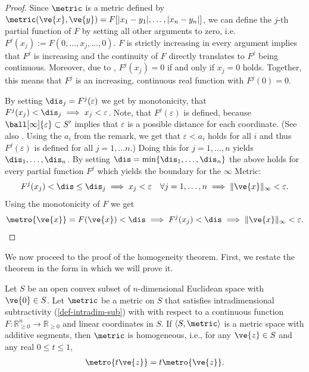 \begin{proof}
  Since $\metric$ is a metric defined by $\metric(\ve{x},\ve{y}) = F[|x_1 - y_1|, \dots, |x_n - y_n|]$, we can define the $j$-th partial function of $F$ by setting all other arguments to zero, i.e. $F^j(x_j) := F(0, \dots, x_j, \dots, 0)$.
  $F$ is strictly increasing in every argument implies that $F^j$ is increasing and the continuity of $F$ directly translates to $F^j$ being continuous.
  Moreover, due to , $F^j(x_j) = 0$ if and only if $x_j = 0$ holds.
  Together, this means that $F^j$ is an increasing, continuous real function with $F^j(0) = 0$.

	By setting $\dis_j = F^j(\varepsilon)$ we get by monotonicity, that $F^j(x_j) < \dis_j \implies x_j < \varepsilon$. Note, that $F^j(\varepsilon)$ is defined, because  $\ball[\infty]{\varepsilon} \subset S'$ implies that $\varepsilon$ is a possible distance for each coordinate. (See also . Using the $a_i$ from the remark, we get that $\varepsilon < a_i$ holds for all $i$ and thus $F^j(\varepsilon)$ is defined for all $j = 1, \dots n$.)
	Doing this for $j = 1, \dots, n$ yields $\dis_1, \dots, \dis_n$.
	By setting $\dis = \min \{\dis_1, \dots, \dis_n\}$ the above holds for every partial function $F^j$ which yields the boundary for the $\infty$ Metric:
	$$ F^j(x_j) < \dis \leq \dis_j \implies x_j < \varepsilon \quad \forall j = 1, \dots, n \implies \|\ve{x}\|_{\infty} < \varepsilon.$$
	Using the monotonicity of $F$ we get
	$$\metro{\ve{x}} = F(\ve{x}) < \dis \implies F^j(x_j) < \dis \implies \|\ve{x}\|_\infty < \varepsilon.$$
\end{proof}

We now proceed to the proof of the homogeneity theorem. First, we restate the theorem in the form in which we will prove it.

\begin{lem*}
  Let $S$ be an open convex subset of $n$-dimensional Euclidean space with $\ve{0} \in S$. Let $\metric$ be a metric on $S$ that satisfies intradimensional subtractivity (\cref{def-intradim-sub}) with with respect to a continuous function $F: \mathbb{R}_{\geq 0}^n \rightarrow \mathbb{R}_{\geq 0}$ and linear coordinates in $S$. If $\langle S, \metric \rangle$ is a metric space with additive segments, then $\metric$ is homogeneous, i.e., for any $\ve{z} \in S$ and any real $0 \leq t \leq 1$,
	\begin{align*}
    \metro{t\ve{z}} = t\metro{\ve{z}}.
	\end{align*}
\end{lem*}

